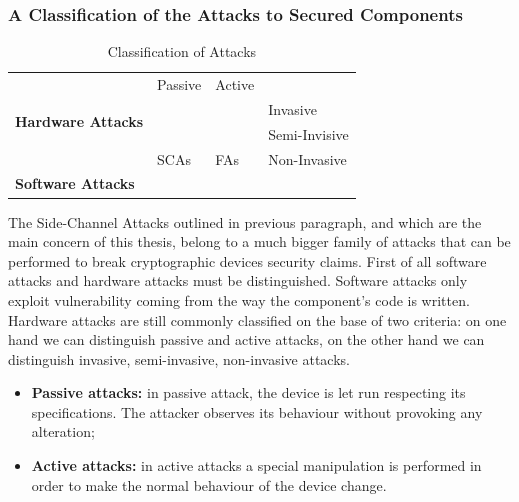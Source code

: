 \subsubsection{A Classification of the Attacks to Secured Components}
\begin{table}[]
\centering
\caption{Classification of Attacks}
\label{fig:classification_attacks}
\begin{tabular}{|l|lll}
\cline{1-3}
\multirow{4}{*}{\textbf{Hardware Attacks}} & \multicolumn{1}{l|}{Passive} & \multicolumn{1}{l|}{Active} &                                    \\ \cline{2-4} 
                                           & \multicolumn{1}{l|}{}        & \multicolumn{1}{l|}{}       & \multicolumn{1}{l|}{Invasive}      \\ \cline{2-4} 
                                           & \multicolumn{1}{l|}{}        & \multicolumn{1}{l|}{}       & \multicolumn{1}{l|}{Semi-Invisive} \\ \cline{2-4} 
                                           & \multicolumn{1}{l|}{SCAs}    & \multicolumn{1}{l|}{FAs}    & \multicolumn{1}{l|}{Non-Invasive}  \\ \hline
\textbf{Software Attacks}                  &                              &                             &                                    \\ \cline{1-1}
\end{tabular}
\end{table}

The Side-Channel Attacks outlined in previous paragraph, and which are the main concern of this thesis,  belong to a much bigger family of attacks that can be performed to break cryptographic devices security claims. First of all software attacks and hardware attacks must be distinguished. Software attacks only exploit vulnerability coming from the way the component's code is written. Hardware attacks are still commonly classified on the base of two criteria: on one hand we can distinguish passive and active attacks, on the other hand we can distinguish invasive, semi-invasive, non-invasive attacks. 
\begin{itemize}
\item[] \textbf{Passive attacks:} in passive attack, the device is let run respecting its specifications. The attacker observes its behaviour without provoking any alteration;
\item[] \textbf{Active attacks:}  in active attacks a special manipulation is performed in order to make the normal behaviour of the device change. 
\end{itemize}


